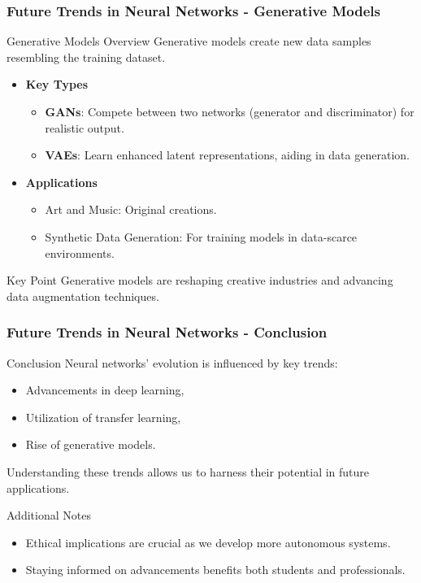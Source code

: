 \documentclass[aspectratio=169]{beamer}
\begin{document}
\begin{frame}[fragile]
    \frametitle{Future Trends in Neural Networks - Generative Models}
    \begin{block}{Generative Models Overview}
        Generative models create new data samples resembling the training dataset.
        \begin{itemize}
            \item \textbf{Key Types}
                \begin{itemize}
                    \item \textbf{GANs}: Compete between two networks (generator and discriminator) for realistic output.
                    \item \textbf{VAEs}: Learn enhanced latent representations, aiding in data generation.
                \end{itemize}
            \item \textbf{Applications}
                \begin{itemize}
                    \item Art and Music: Original creations.
                    \item Synthetic Data Generation: For training models in data-scarce environments.
                \end{itemize}
        \end{itemize}
    \end{block}
    \begin{block}{Key Point}
        Generative models are reshaping creative industries and advancing data augmentation techniques.
    \end{block}
\end{frame}

\begin{frame}[fragile]
    \frametitle{Future Trends in Neural Networks - Conclusion}
    \begin{block}{Conclusion}
        Neural networks' evolution is influenced by key trends:
        \begin{itemize}
            \item Advancements in deep learning, 
            \item Utilization of transfer learning,
            \item Rise of generative models.
        \end{itemize}
        Understanding these trends allows us to harness their potential in future applications.
    \end{block}
    \begin{block}{Additional Notes}
        \begin{itemize}
            \item Ethical implications are crucial as we develop more autonomous systems.
            \item Staying informed on advancements benefits both students and professionals.
        \end{itemize}
    \end{block}
\end{frame}
\end{document}
